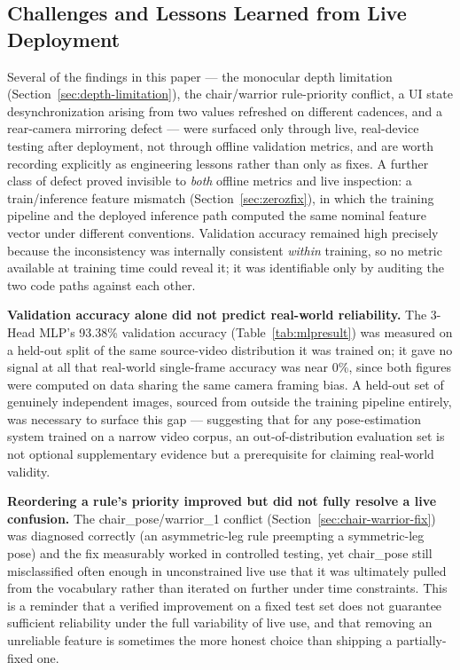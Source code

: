 \documentclass[conference]{IEEEtran}
\begin{document}
\subsection{Challenges and Lessons Learned from Live Deployment}
\label{sec:lessons}

Several of the findings in this paper --- the monocular depth limitation
(Section~\ref{sec:depth-limitation}), the chair/warrior rule-priority conflict,
a UI state desynchronization arising from two values refreshed on different
cadences, and a rear-camera mirroring defect --- were surfaced only through
live, real-device testing after deployment, not through offline validation
metrics, and are worth recording explicitly as engineering lessons rather than
only as fixes. A further class of defect proved invisible to \emph{both} offline
metrics and live inspection: a train/inference feature mismatch
(Section~\ref{sec:zerozfix}), in which the training pipeline and the deployed
inference path computed the same nominal feature vector under different
conventions. Validation accuracy remained high precisely because the
inconsistency was internally consistent \emph{within} training, so no metric
available at training time could reveal it; it was identifiable only by
auditing the two code paths against each other.

\textbf{Validation accuracy alone did not predict real-world reliability.} The
3-Head MLP's 93.38\% validation accuracy (Table~\ref{tab:mlpresult}) was
measured on a held-out split of the same source-video distribution it was
trained on; it gave no signal at all that real-world single-frame accuracy was
near 0\%, since both figures were computed on data sharing the same camera
framing bias. A held-out set of genuinely independent images, sourced from
outside the training pipeline entirely, was necessary to surface this gap ---
suggesting that for any pose-estimation system trained on a narrow video
corpus, an out-of-distribution evaluation set is not optional supplementary
evidence but a prerequisite for claiming real-world validity.

\textbf{Reordering a rule's priority improved but did not fully resolve a live
confusion.} The chair\_pose/warrior\_1 conflict (Section~\ref{sec:chair-warrior-fix})
was diagnosed correctly (an asymmetric-leg rule preempting a symmetric-leg pose)
and the fix measurably worked in controlled testing, yet chair\_pose still
misclassified often enough in unconstrained live use that it was ultimately
pulled from the vocabulary rather than iterated on further under time
constraints. This is a reminder that a verified improvement on a fixed test set
does not guarantee sufficient reliability under the full variability of live
use, and that removing an unreliable feature is sometimes the more honest
choice than shipping a partially-fixed one.
\end{document}

